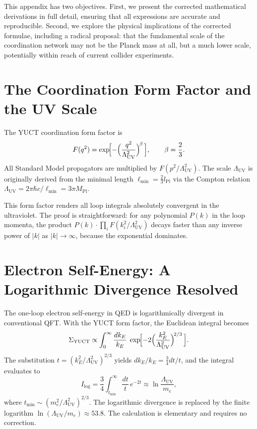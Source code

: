 \documentclass[12pt,a4paper]{article}
\newcommand{\Mpl}{M_{\mathrm{Pl}}}
\newcommand{\Lpl}{l_{\mathrm{Pl}}}
\newcommand{\Lmin}{\ell_{\min}}
\newcommand{\LUV}{\Lambda_{\mathrm{UV}}}
\theoremstyle{remark}
\begin{document}
	This appendix has two objectives.  First, we present the corrected mathematical derivations in full detail, ensuring that all expressions are accurate and reproducible.  Second, we explore the physical implications of the corrected formulae, including a radical proposal: that the fundamental scale of the coordination network may not be the Planck mass at all, but a much lower scale, potentially within reach of current collider experiments.
	
	\section{The Coordination Form Factor and the UV Scale}
	\label{sec:formfactor}
	
	The YUCT coordination form factor is
	\begin{equation}
		F(q^2) = \exp\!\Bigl[-\Bigl(\frac{q^2}{\LUV^2}\Bigr)^{\!\beta}\,\Bigr], \qquad \beta = \frac{2}{3}.
		\label{eq:F}
	\end{equation}
	All Standard Model propagators are multiplied by \(F(p^2/\LUV^2)\).  The scale \(\LUV\) is originally derived from the minimal length \(\Lmin = \frac{2}{3}\Lpl\) via the Compton relation \(\LUV = 2\pi\hbar c/\Lmin = 3\pi\Mpl\).
	
	This form factor renders all loop integrals absolutely convergent in the ultraviolet.  The proof is straightforward: for any polynomial \(P(k)\) in the loop momenta, the product \(P(k) \cdot \prod_i F(k_i^2/\LUV^2)\) decays faster than any inverse power of \(|k|\) as \(|k| \to \infty\), because the exponential dominates.
	
	\section{Electron Self-Energy: A Logarithmic Divergence Resolved}
	\label{sec:electron}
	
	The one-loop electron self-energy in QED is logarithmically divergent in conventional QFT.  With the YUCT form factor, the Euclidean integral becomes
	\begin{equation}
		\Sigma_{\mathrm{YUCT}} \propto \int_0^{\infty} \frac{dk_E}{k_E}\; \exp\!\Bigl[-2\Bigl(\frac{k_E^2}{\LUV^2}\Bigr)^{\!2/3}\,\Bigr].
		\label{eq:elec_int}
	\end{equation}
	The substitution \(t = (k_E^2/\LUV^2)^{2/3}\) yields \(dk_E/k_E = \frac{3}{4} dt/t\), and the integral evaluates to
	\begin{equation}
		I_{\mathrm{log}} = \frac{3}{4} \int_{t_{\min}}^{\infty} \frac{dt}{t}\, e^{-2t} \approx \ln\frac{\LUV}{m_e},
		\label{eq:elec_result}
	\end{equation}
	where \(t_{\min} \sim (m_e^2/\LUV^2)^{2/3}\).  The logarithmic divergence is replaced by the finite logarithm \(\ln(\LUV/m_e) \approx 53.8\).  The calculation is elementary and requires no correction.
	
\end{document}
